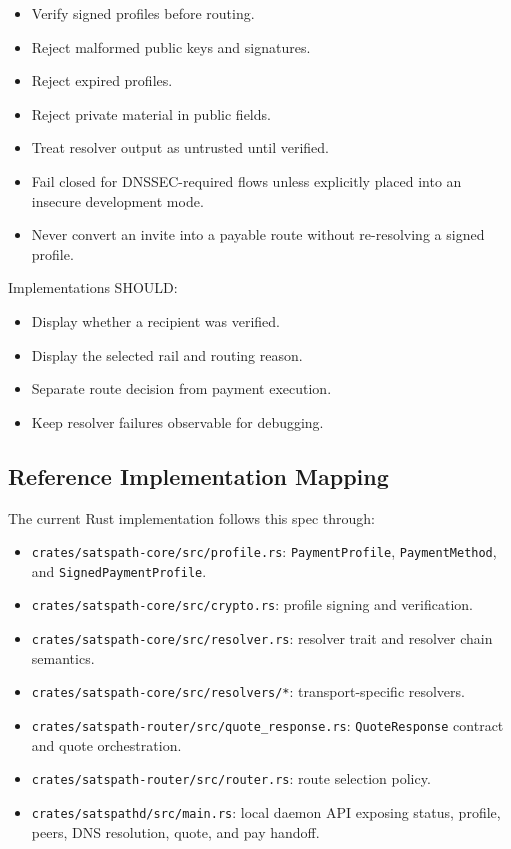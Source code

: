 \documentclass[
]{article}
\providecommand{\tightlist}{%
  \setlength{\itemsep}{0pt}\setlength{\parskip}{0pt}}
\begin{document}
\begin{itemize}
\tightlist
\item
  Verify signed profiles before routing.
\item
  Reject malformed public keys and signatures.
\item
  Reject expired profiles.
\item
  Reject private material in public fields.
\item
  Treat resolver output as untrusted until verified.
\item
  Fail closed for DNSSEC-required flows unless explicitly placed into an
  insecure development mode.
\item
  Never convert an invite into a payable route without re-resolving a
  signed profile.
\end{itemize}

Implementations SHOULD:

\begin{itemize}
\tightlist
\item
  Display whether a recipient was verified.
\item
  Display the selected rail and routing reason.
\item
  Separate route decision from payment execution.
\item
  Keep resolver failures observable for debugging.
\end{itemize}

\hypertarget{reference-implementation-mapping}{%
\subsection{Reference Implementation
Mapping}\label{reference-implementation-mapping}}

The current Rust implementation follows this spec through:

\begin{itemize}
\tightlist
\item
  \texttt{crates/satspath-core/src/profile.rs}: \texttt{PaymentProfile},
  \texttt{PaymentMethod}, and \texttt{SignedPaymentProfile}.
\item
  \texttt{crates/satspath-core/src/crypto.rs}: profile signing and
  verification.
\item
  \texttt{crates/satspath-core/src/resolver.rs}: resolver trait and
  resolver chain semantics.
\item
  \texttt{crates/satspath-core/src/resolvers/*}: transport-specific
  resolvers.
\item
  \texttt{crates/satspath-router/src/quote\_response.rs}:
  \texttt{QuoteResponse} contract and quote orchestration.
\item
  \texttt{crates/satspath-router/src/router.rs}: route selection policy.
\item
  \texttt{crates/satspathd/src/main.rs}: local daemon API exposing
  status, profile, peers, DNS resolution, quote, and pay handoff.
\end{itemize}
\end{document}

